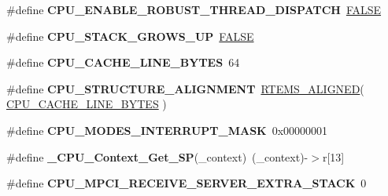 \begin{DoxyCompactItemize}
\mbox{\label{group__RTEMSScoreCPUEpiphany_ga0c634f4a6bc9236bcacafc9b6119e011}} 
\#define {\bfseries C\+P\+U\+\_\+\+E\+N\+A\+B\+L\+E\+\_\+\+R\+O\+B\+U\+S\+T\+\_\+\+T\+H\+R\+E\+A\+D\+\_\+\+D\+I\+S\+P\+A\+T\+CH}~\mbox{\hyperlink{group__RTEMSScoreBaseDefs_gaa93f0eb578d23995850d61f7d61c55c1}{F\+A\+L\+SE}}
\item 
\mbox{\label{group__RTEMSScoreCPUEpiphany_gac40d98a563f63934a5775f1366ba1b67}} 
\#define {\bfseries C\+P\+U\+\_\+\+S\+T\+A\+C\+K\+\_\+\+G\+R\+O\+W\+S\+\_\+\+UP}~\mbox{\hyperlink{group__RTEMSScoreBaseDefs_gaa93f0eb578d23995850d61f7d61c55c1}{F\+A\+L\+SE}}
\item 
\mbox{\label{group__RTEMSScoreCPUEpiphany_gaafa1399e268a9ae6adf6d6aad4371688}} 
\#define {\bfseries C\+P\+U\+\_\+\+C\+A\+C\+H\+E\+\_\+\+L\+I\+N\+E\+\_\+\+B\+Y\+T\+ES}~64
\item 
\mbox{\label{group__RTEMSScoreCPUEpiphany_gacd43704c7821a2c042d212801156584e}} 
\#define {\bfseries C\+P\+U\+\_\+\+S\+T\+R\+U\+C\+T\+U\+R\+E\+\_\+\+A\+L\+I\+G\+N\+M\+E\+NT}~\mbox{\hyperlink{structRTEMS__ALIGNED}{R\+T\+E\+M\+S\+\_\+\+A\+L\+I\+G\+N\+ED}}( \mbox{\hyperlink{no__cpu_2include_2rtems_2score_2cpu_8h_aafa1399e268a9ae6adf6d6aad4371688}{C\+P\+U\+\_\+\+C\+A\+C\+H\+E\+\_\+\+L\+I\+N\+E\+\_\+\+B\+Y\+T\+ES}} )
\item 
\mbox{\label{group__RTEMSScoreCPUEpiphany_gaf8823e651e33b9683e0d89e5a8054ee6}} 
\#define {\bfseries C\+P\+U\+\_\+\+M\+O\+D\+E\+S\+\_\+\+I\+N\+T\+E\+R\+R\+U\+P\+T\+\_\+\+M\+A\+SK}~0x00000001
\item 
\mbox{\label{group__RTEMSScoreCPUEpiphany_ga896055157b72692a6141f7c0039eabdf}} 
\#define {\bfseries \+\_\+\+C\+P\+U\+\_\+\+Context\+\_\+\+Get\+\_\+\+SP}(\+\_\+context)~(\+\_\+context)-\/$>$r\mbox{[}13\mbox{]}
\item 
\mbox{\label{group__RTEMSScoreCPUEpiphany_gab94869be93a41da88a10fa59771ce2c9}} 
\#define {\bfseries C\+P\+U\+\_\+\+M\+P\+C\+I\+\_\+\+R\+E\+C\+E\+I\+V\+E\+\_\+\+S\+E\+R\+V\+E\+R\+\_\+\+E\+X\+T\+R\+A\+\_\+\+S\+T\+A\+CK}~0
\item 

\end{DoxyCompactItemize}

